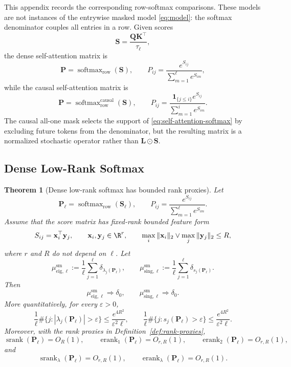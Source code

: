\documentclass{article}
\newcommand{\srank}{\operatorname{srank}}
\newcommand{\erank}{\operatorname{erank}}
\newcommand{\weak}{\Rightarrow}
\newcommand{\one}{\mathbf{1}}
\newcommand{\hadamard}{\mathbin{\odot}}
\newcommand{\bL}{\mathbf{L}}
\newcommand{\bP}{\mathbf{P}}
\newcommand{\bS}{\mathbf{S}}
\newcommand{\bQ}{\mathbf{Q}}
\newcommand{\bK}{\mathbf{K}}
\newtheorem{theorem}{Theorem}
\theoremstyle{definition}
\theoremstyle{remark}
\begin{document}
This appendix records the corresponding row-softmax comparisons.  These models
are not instances of the entrywise masked model \eqref{eq:model}: the softmax
denominator couples all entries in a row.  Given scores
\[
    \bS=\frac{\bQ\bK^\top}{\tau_\ell},
\]
the dense self-attention matrix is
\[
    \bP=\operatorname{softmax}_{\mathrm{row}}(\bS),
    \qquad
    P_{ij}=\frac{e^{S_{ij}}}{\sum_{m=1}^{\ell}e^{S_{im}}},
\]
while the causal self-attention matrix is
\begin{equation}
    \bP=\operatorname{softmax}_{\mathrm{row}}^{\mathrm{causal}}(\bS),
    \qquad
    P_{ij}
    =
    \frac{\one_{\{j\leq i\}}e^{S_{ij}}}
    {\sum_{m=1}^{i}e^{S_{im}}}.
    \label{eq:self-attention-softmax}
\end{equation}
The causal all-one mask selects the support of \eqref{eq:self-attention-softmax}
by excluding future tokens from the denominator, but the resulting matrix is a
normalized stochastic operator rather than $\bL\hadamard\bS$.

\subsection{Dense Low-Rank Softmax}

\begin{theorem}[Dense low-rank softmax has bounded rank proxies]
\label{thm:dense-low-rank-softmax-collapse}
Let
\[
    \bP_\ell=\operatorname{softmax}_{\mathrm{row}}(\bS_\ell),
    \qquad
    P_{ij}=\frac{e^{S_{ij}}}{\sum_{m=1}^{\ell}e^{S_{im}}}.
\]
Assume that the score matrix has fixed-rank bounded feature form
\begin{equation}
    S_{ij}=\mathbf x_i^\top\mathbf y_j,\qquad
    \mathbf x_i,\mathbf y_j\in\R^r,\qquad
    \max_i\|\mathbf x_i\|_2\vee\max_j\|\mathbf y_j\|_2\leq R,
    \label{eq:bounded-low-rank-dense-softmax-scores}
\end{equation}
where $r$ and $R$ do not depend on $\ell$.  Let
\[
    \mu_{\mathrm{eig},\ell}^{\mathrm{sm}}
    :=
    \frac1\ell\sum_{j=1}^{\ell}\delta_{\lambda_j(\bP_\ell)},
    \qquad
    \mu_{\mathrm{sing},\ell}^{\mathrm{sm}}
    :=
    \frac1\ell\sum_{j=1}^{\ell}\delta_{s_j(\bP_\ell)}.
\]
Then
\[
    \mu_{\mathrm{eig},\ell}^{\mathrm{sm}}\weak\delta_0,
    \qquad
    \mu_{\mathrm{sing},\ell}^{\mathrm{sm}}\weak\delta_0.
\]
More quantitatively, for every $\varepsilon>0$,
\[
    \frac1\ell\#\{j:|\lambda_j(\bP_\ell)|>\varepsilon\}
    \leq
    \frac{e^{4R^2}}{\varepsilon^2\ell},
    \qquad
    \frac1\ell\#\{j:s_j(\bP_\ell)>\varepsilon\}
    \leq
    \frac{e^{4R^2}}{\varepsilon^2\ell}.
    \label{eq:dense-softmax-lsd-collapse-count}
\]
Moreover, with the rank proxies in Definition~\ref{def:rank-proxies},
\[
    \srank(\bP_\ell)=O_R(1),
    \qquad
    \erank_1(\bP_\ell)=O_{r,R}(1),
    \qquad
    \erank_2(\bP_\ell)=O_{r,R}(1),
\]
and
\[
    \srank_\lambda(\bP_\ell)=O_{r,R}(1),
    \qquad
    \erank_\lambda(\bP_\ell)=O_{r,R}(1).
\]
\end{theorem}
\end{document}
